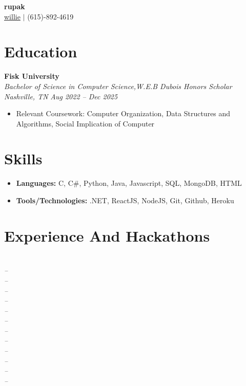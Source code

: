 \documentclass[letterpaper,11pt]{article}
\begin{document}
\begin{center}
  {\LARGE\bfseries rupak} \\[4pt]
  \small
  \href{mailto:willie}{willie}   $|$ (615)-892-4619      \end{center}

\section{Education}
\textbf{Fisk University} \hfill  \\
\textit{Bachelor of Science in Computer Science,W.E.B Dubois Honors Scholar Nashville, TN} \hfill \textit{Aug 2022 -- Dec 2025}
\begin{itemize}
  \item Relevant Coursework: Computer Organization, Data Structures and Algorithms, Social Implication of Computer
\end{itemize}








\section{Skills}
\begin{itemize}[label={}]
  \item \textbf{Languages:} C, C\#, Python, Java, Javascript, SQL, MongoDB, HTML
  \item \textbf{Tools/Technologies:} .NET, ReactJS, NodeJS, Git, Github, Heroku
\end{itemize}



\section{Experience And Hackathons}
\textbf{} \hfill  \\
\textit{} \hfill \textit{ -- }
\textbf{} \hfill  \\
\textit{} \hfill \textit{ -- }
\textbf{} \hfill  \\
\textit{} \hfill \textit{ -- }
\textbf{} \hfill  \\
\textit{} \hfill \textit{ -- }
\textbf{} \hfill  \\
\textit{} \hfill \textit{ -- }
\textbf{} \hfill  \\
\textit{} \hfill \textit{ -- }
\textbf{} \hfill  \\
\textit{} \hfill \textit{ -- }
\textbf{} \hfill  \\
\textit{} \hfill \textit{ -- }
\textbf{} \hfill  \\
\textit{} \hfill \textit{ -- }
\textbf{} \hfill  \\
\textit{} \hfill \textit{ -- }
\textbf{} \hfill  \\
\textit{} \hfill \textit{ -- }
\textbf{} \hfill  \\
\textit{} \hfill \textit{ -- }
\end{document}
